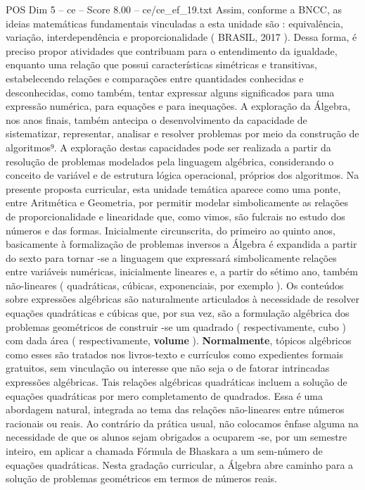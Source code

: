 \begin{textsample}{POS Dim 5 – ce – Score 8.00 – ce/ce\_ef\_19.txt}
Assim, conforme a BNCC, as ideias matemáticas fundamentais vinculadas a esta unidade são : equivalência, variação, interdependência e proporcionalidade ( BRASIL, 2017 ).
Dessa forma, é preciso propor atividades que contribuam para o entendimento da igualdade, enquanto uma relação que possui características simétricas e transitivas, estabelecendo relações e comparações entre quantidades conhecidas e desconhecidas, como também, tentar expressar alguns significados para uma expressão numérica, para equações e para inequações.
A exploração da Álgebra, nos anos finais, também antecipa o desenvolvimento da capacidade de sistematizar, representar, analisar e resolver problemas por meio da construção de algoritmos⁹.
A exploração destas capacidades pode ser realizada a partir da resolução de problemas modelados pela linguagem algébrica, considerando o conceito de variável e de estrutura lógica operacional, próprios dos algoritmos.
Na presente proposta curricular, esta unidade temática aparece como uma ponte, entre Aritmética e Geometria, por permitir modelar simbolicamente as relações de proporcionalidade e linearidade que, como vimos, são fulcrais no estudo dos números e das formas.
Inicialmente circunscrita, do primeiro ao quinto anos, basicamente à formalização de problemas inversos a Álgebra é expandida a partir do sexto para tornar -se a linguagem que expressará simbolicamente relações entre variáveis numéricas, inicialmente lineares e, a partir do sétimo ano, também não-lineares ( quadráticas, cúbicas, exponenciais, por exemplo ).
Os conteúdos sobre expressões algébricas são naturalmente articulados à necessidade de resolver equações quadráticas e cúbicas que, por sua vez, são a formulação algébrica dos problemas geométricos de construir -se um quadrado ( respectivamente, cubo ) com dada área ( respectivamente, \textbf{volume} ). \textbf{Normalmente}, tópicos algébricos como esses são tratados nos livros-texto e currículos como expedientes formais gratuitos, sem vinculação ou interesse que não seja o de fatorar intrincadas expressões algébricas.
Tais relações algébricas quadráticas incluem a solução de equações quadráticas por mero completamento de quadrados.
Essa é uma abordagem natural, integrada ao tema das relações não-lineares entre números racionais ou reais.
Ao contrário da prática usual, não colocamos ênfase alguma na necessidade de que os alunos sejam obrigados a ocuparem -se, por um semestre inteiro, em aplicar a chamada Fórmula de Bhaskara a um sem-número de equações quadráticas.
Nesta gradação curricular, a Álgebra abre caminho para a solução de problemas geométricos em termos de números reais.

\end{textsample}
